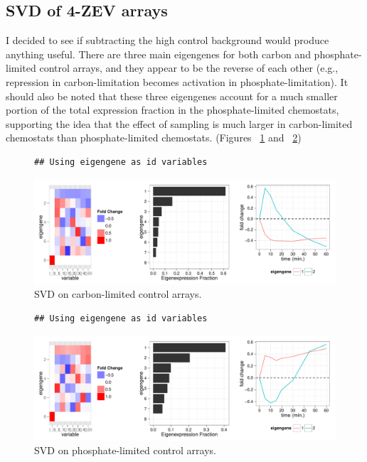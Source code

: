 \documentclass[letter]{article}\usepackage{graphicx, color}
\makeatletter
\def\maxwidth{ %
  \ifdim\Gin@nat@width>\linewidth
    \linewidth
  \else
    \Gin@nat@width
  \fi
}
\newenvironment{kframe}{%
 \def\FrameCommand##1{\hskip\@totalleftmargin \hskip-\fboxsep
 \colorbox{shadecolor}{##1}\hskip-\fboxsep
     \hskip-\linewidth \hskip-\@totalleftmargin \hskip\columnwidth}%
 \MakeFramed {\advance\hsize-\width
   \@totalleftmargin\z@ \linewidth\hsize
   \@setminipage}}%
 {\par\unskip\endMakeFramed}
\newenvironment{knitrout}{}{} %
\makeatother
\begin{document}
\subsection*{SVD of 4-ZEV arrays}
I decided to see if subtracting the high control background would produce anything useful. There are three main eigengenes for both carbon and phosphate-limited control arrays, and they appear to be the reverse of each other (e.g., repression in carbon-limitation becomes activation in phosphate-limitation). It should also be noted that these three eigengenes account for a much smaller portion of the total expression fraction in the phosphate-limited chemostats, supporting the idea that the effect of sampling is much larger in carbon-limited chemostats than phosphate-limited chemostats. (Figures ~\ref{fig:csvd} and ~\ref{fig:psvd})
\begin{figure}
\centering
\begin{knitrout}
\color{fgcolor}\begin{kframe}
\begin{verbatim}
## Using eigengene as id variables
\end{verbatim}
\end{kframe}\includegraphics[width=\maxwidth]{figure/svd-carbon} 
\end{knitrout}

\caption{SVD on carbon-limited control arrays.}
\label{fig:csvd}
\end{figure}

\begin{figure}
\centering
\begin{knitrout}
\color{fgcolor}\begin{kframe}
\begin{verbatim}
## Using eigengene as id variables
\end{verbatim}
\end{kframe}\includegraphics[width=\maxwidth]{figure/svd-phosphate} 
\end{knitrout}

\caption{SVD on phosphate-limited control arrays.}
\label{fig:psvd}
\end{figure}
\end{document}
